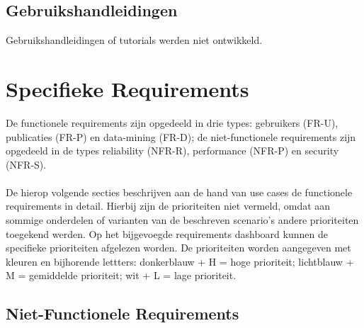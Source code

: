 \documentclass{article}
\begin{document}
\subsection{Gebruikshandleidingen}

Gebruikshandleidingen of tutorials werden niet ontwikkeld. 


\clearpage


\section{Specifieke Requirements}
\label{sec:systemRequirements}

\noindent De functionele requirements zijn opgedeeld in drie types: gebruikers (FR-U), publicaties (FR-P) en data-mining (FR-D); de niet-functionele requirements zijn opgedeeld in de types reliability (NFR-R), performance (NFR-P) en security (NFR-S).  \\
\\
\noindent De hierop volgende secties beschrijven aan de hand van use cases de functionele requirements in detail. Hierbij zijn de prioriteiten niet vermeld, omdat aan sommige onderdelen of varianten van de beschreven scenario's andere prioriteiten toegekend werden. Op het bijgevoegde requirements dashboard kunnen de specifieke prioriteiten afgelezen worden. De prioriteiten worden aangegeven met kleuren en bijhorende lettters:  donkerblauw + H  = hoge prioriteit;  lichtblauw + M = gemiddelde prioriteit;  wit + L = lage prioriteit.



\subsection{Niet-Functionele Requirements}


\end{document}

